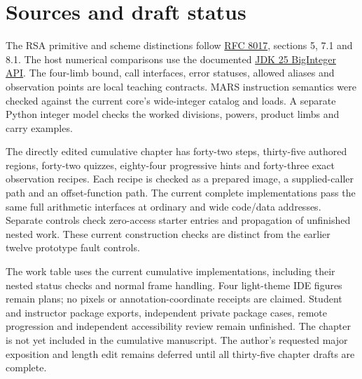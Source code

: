 \section{Sources and draft status}
The RSA primitive and scheme distinctions follow
\href{https://www.rfc-editor.org/rfc/rfc8017.html}{RFC 8017}, sections 5, 7.1 and 8.1.
The host numerical comparisons use the documented
\href{https://docs.oracle.com/en/java/javase/25/docs/api/java.base/java/math/BigInteger.html}{JDK 25 BigInteger API}.
The four-limb bound, call interfaces, error statuses, allowed aliases and observation
points are local teaching contracts. MARS instruction semantics were checked against
the current core's wide-integer catalog and loads. A separate Python integer model
checks the worked divisions, powers, product limbs and carry examples.

The directly edited cumulative chapter has forty-two steps, thirty-five authored
regions, forty-two quizzes, eighty-four progressive hints and forty-three exact
observation recipes. Each recipe is checked as a prepared image, a supplied-caller path
and an offset-function path. The current complete implementations pass the same full
arithmetic interfaces at ordinary and wide code/data addresses. Separate controls check
zero-access starter entries and propagation of unfinished nested work. These current
construction checks are distinct from the earlier twelve prototype fault controls.

The work table uses the current cumulative implementations, including their nested
status checks and normal frame handling. Four light-theme IDE figures remain plans;
no pixels or annotation-coordinate receipts are claimed. Student and instructor package
exports, independent private package cases, remote progression and independent
accessibility review remain unfinished. The chapter is not yet included in the cumulative
manuscript. The author's requested major exposition and length edit remains deferred
until all thirty-five chapter drafts are complete.
